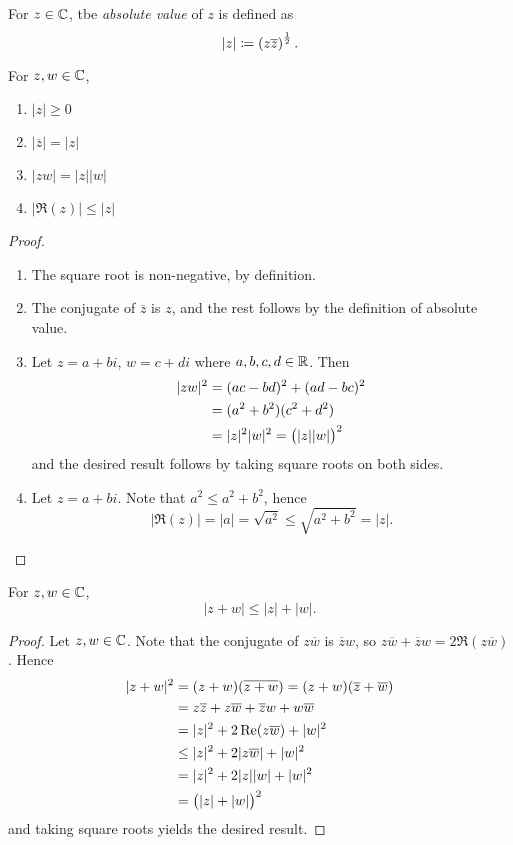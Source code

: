 For $z\in\mathbb C$, tbe \emph{absolute value} of $z$ is defined as
\[|z|\coloneqq\left(z\overline{z}\right)^\frac{1}{2}.\]

\begin{lemma}
For $z,w\in\mathbb C$,
\begin{enumerate}[label=(\roman*)]
\item $|z|\ge0$
\item $|\overline{z}|=|z|$
\item $|zw|=|z||w|$
\item $|\Re(z)|\le|z|$
\end{enumerate}
\end{lemma}

\begin{proof} \
\begin{enumerate}[label=(\roman*)]
\item The square root is non-negative, by definition.
\item The conjugate of $\overline{z}$ is $z$, and the rest follows by the definition of absolute value.
\item Let $z=a+bi$, $w=c+di$ where $a,b,c,d\in\mathbb R$. Then
\begin{align*}
|zw|^2&=(ac-bd)^2+(ad-bc)^2\\
&=(a^2+b^2)(c^2+d^2)\\
&=|z|^2|w|^2=\left(|z||w|\right)^2
\end{align*}
and the desired result follows by taking square roots on both sides.
\item Let $z=a+bi$. Note that $a^2\le a^2+b^2$, hence
\[|\Re(z)|=|a|=\sqrt{a^2}\le\sqrt{a^2+b^2}=|z|.\]
\end{enumerate}
\end{proof}

\begin{theorem}
For $z,w\in\mathbb C$,
\begin{equation}
|z+w|\le|z|+|w|.
\end{equation}
\end{theorem}

\begin{proof}
Let $z,w\in\mathbb C$. Note that the conjugate of $z\overline{w}$ is $\overline{z}w$, so $z\overline{w}+\overline{z}w=2\Re(z\overline{w})$. Hence
\begin{align*}
|z+w|^2&=(z+w)(\overline{z+w})=(z+w)(\overline{z}+\overline{w})\\
&=z\overline{z}+z\overline{w}+\overline{z}w+w\overline{w}\\
&=|z|^2+2\Re(z\overline{w})+|w|^2\\
&\le|z|^2+2|z\overline{w}|+|w|^2\\
&=|z|^2+2|z||w|+|w|^2\\
&=\left(|z|+|w|\right)^2
\end{align*}
and taking square roots yields the desired result.
\end{proof}

